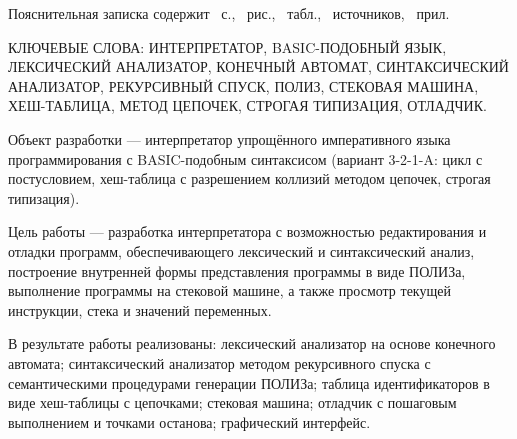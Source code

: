 \documentclass[14pt,a4paper]{article}
\begin{document}


\begin{figure}[H]
  \centering
\end{figure}


Пояснительная записка содержит \underline{\hspace{1cm}}~с., \underline{\hspace{1cm}}~рис.,
\underline{\hspace{1cm}}~табл., \underline{\hspace{1cm}}~источников, \underline{\hspace{1cm}}~прил.

\vspace{6pt}
КЛЮЧЕВЫЕ СЛОВА: ИНТЕРПРЕТАТОР, BASIC-ПОДОБНЫЙ ЯЗЫК, ЛЕКСИЧЕСКИЙ
АНАЛИЗАТОР, КОНЕЧНЫЙ АВТОМАТ, СИНТАКСИЧЕСКИЙ АНАЛИЗАТОР,
РЕКУРСИВНЫЙ СПУСК, ПОЛИЗ, СТЕКОВАЯ МАШИНА, ХЕШ-ТАБЛИЦА,
МЕТОД ЦЕПОЧЕК, СТРОГАЯ ТИПИЗАЦИЯ, ОТЛАДЧИК.

\vspace{6pt}
Объект разработки — интерпретатор упрощённого императивного
языка программирования с BASIC-подобным синтаксисом (вариант 3-2-1-A:
цикл с постусловием, хеш-таблица с разрешением коллизий методом
цепочек, строгая типизация).

Цель работы — разработка интерпретатора с возможностью
редактирования и отладки программ, обеспечивающего лексический
и синтаксический анализ, построение внутренней формы представления
программы в виде ПОЛИЗа, выполнение программы на стековой машине,
а также просмотр текущей инструкции, стека и значений переменных.

В результате работы реализованы: лексический анализатор на основе
конечного автомата; синтаксический анализатор методом рекурсивного
спуска с семантическими процедурами генерации ПОЛИЗа; таблица
идентификаторов в виде хеш-таблицы с цепочками; стековая машина;
отладчик с пошаговым выполнением и точками останова; графический
интерфейс.
\end{document}
